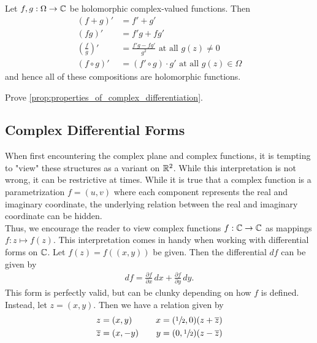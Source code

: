 \documentclass{memoir}
\begin{document}
\begin{prop}\label{prop:properties_of_complex_differentiation}
	Let \(f,g:\Omega \to \mathbb{C}\) be holomorphic complex-valued functions. Then
	\begin{align*}
		(f+g)' &= f'+g'\\
		(fg)' &= f'g + fg'\\
		\left( \frac{f}{g} \right)' &= \frac{f'g-fg'}{g^2} \text{ at all \(g(z)\neq 0\)}\\
		(f \circ g)' &= (f'\circ g)\cdot g' \text{ at all \(g(z) \in \Omega\)}
	\end{align*}
	and hence all of these compositions are holomorphic functions.
\end{prop}

\begin{hw}
	Prove \ref{prop:properties_of_complex_differentiation}.
\end{hw}

\subsection{Complex Differential Forms}
\label{sub:complex_differential_forms}

When first encountering the complex plane and complex functions, it is tempting to "view" these structures as a variant on \(\mathbb{R}^2\). While this interpretation is not wrong, it can be restrictive at times. While it is true that a complex function is a parametrization \(f = (u,v)\) where each component represents the real and imaginary coordinate, the underlying relation between the real and imaginary coordinate can be hidden.\\

Thus, we encourage the reader to view complex functions \(f:\mathbb{C}\to \mathbb{C}\) as mappings \(f:z\mapsto f(z)\). This interpretation comes in handy when working with differential forms on \(\mathbb{C}\). Let \(f(z) = f((x,y))\) be given. Then the differential \(df\) can be given by
\begin{align*}
	df = \frac{\partial f}{\partial x} \,d x + \frac{\partial f}{\partial y} \,d y.
\end{align*}
This form is perfectly valid, but can be clunky depending on how \(f\) is defined. Instead, let \(z = (x,y)\). Then we have a relation given by
\begin{align*}
	z &= (x,y) &\quad x &= (\sfrac{1}{2},0)(z+\overline{z})\\
	\overline{z}&=(x,-y) &\quad y &= (0,\sfrac{1}{2})(z-\overline{z})
\end{align*}
\end{document}
